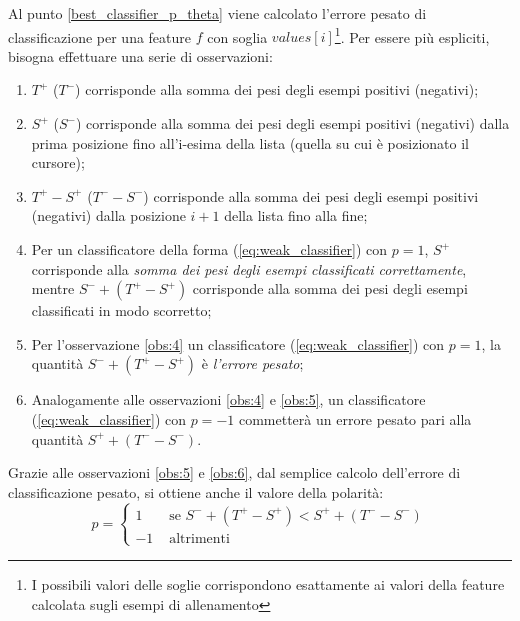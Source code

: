             Al punto \ref{best_classifier_p_theta} viene calcolato l'errore pesato di classificazione per una feature $f$ con soglia $values[i]$\footnote{I possibili valori delle soglie corrispondono esattamente ai valori della feature calcolata sugli esempi di allenamento}. Per essere più espliciti, bisogna effettuare una serie di osservazioni:
            \begin{enumerate}
                \item \label{obs:1} $T^+$ ($T^-$) corrisponde alla somma dei pesi degli esempi positivi (negativi);
                \item \label{obs:2} $S^+$ ($S^-$) corrisponde alla somma dei pesi degli esempi positivi (negativi) dalla prima posizione fino all'i-esima della lista (quella su cui è posizionato il cursore);
                \item \label{obs:3} $T^+ - S^+$ ($T^- - S^-$) corrisponde alla somma dei pesi degli esempi positivi (negativi) dalla posizione $i+1$ della lista fino alla fine;
                \item \label{obs:4} Per un classificatore della forma (\ref{eq:weak_classifier}) con $p = 1$, $S^+$ corrisponde alla \emph{somma dei pesi degli esempi classificati correttamente}, mentre $S^- + (T^+ - S^+)$ corrisponde alla somma dei pesi degli esempi classificati in modo scorretto;
                \item \label{obs:5} Per l'osservazione \ref{obs:4} un classificatore (\ref{eq:weak_classifier}) con $p = 1$, la quantità $S^- + (T^+ - S^+)$ è \emph{l'errore pesato};
                \item \label{obs:6} Analogamente alle osservazioni \ref{obs:4} e \ref{obs:5}, un classificatore (\ref{eq:weak_classifier}) con $p = -1$ commetterà un errore pesato pari alla quantità $S^+ + (T^- - S^-)$.
            \end{enumerate}

            Grazie alle osservazioni \ref{obs:5} e \ref{obs:6}, dal semplice calcolo dell'errore di classificazione pesato, si ottiene anche il valore della polarità:
            \begin{equation}
                p = \begin{cases}
                1 & \text{ se } S^- + (T^+ - S^+) < S^+ + (T^- - S^-) \\
                -1 & \text{ altrimenti }
            \end{cases}
            \end{equation}

